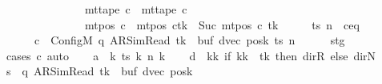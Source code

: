 \begin{isabellebody}
\ \ \ \ \ \ \ \ \ \ \ \ \ \ {\isasymand}\ mt{\isacharunderscore}{\kern0pt}tape\ c{\isacharprime}{\kern0pt}{\isacharprime}{\kern0pt}\ {\isacharequal}{\kern0pt}\ mt{\isacharunderscore}{\kern0pt}tape\ c{\isacharprime}{\kern0pt}\isanewline
\ \ \ \ \ \ \ \ \ \ \ \ \ \ {\isasymand}\ mt{\isacharunderscore}{\kern0pt}pos\ c{\isacharprime}{\kern0pt}{\isacharprime}{\kern0pt}\ {\isacharequal}{\kern0pt}\ {\isacharparenleft}{\kern0pt}mt{\isacharunderscore}{\kern0pt}pos\ c{\isacharprime}{\kern0pt}{\isacharparenright}{\kern0pt}{\isacharparenleft}{\kern0pt}tk\ {\isacharcolon}{\kern0pt}{\isacharequal}{\kern0pt}\ Suc\ {\isacharparenleft}{\kern0pt}mt{\isacharunderscore}{\kern0pt}pos\ c{\isacharprime}{\kern0pt}\ tk{\isacharparenright}{\kern0pt}{\isacharparenright}{\kern0pt}{\isachardoublequoteclose}\isanewline
%
\isadelimproof
%
\endisadelimproof
%
\isatagproof
{}\isamarkupfalse%
\ {\isacharminus}{\kern0pt}\isanewline
\ \ \isamarkupfalse%
\ ts\ n\ \ c{\isacharprime}{\kern0pt}{\isacharunderscore}{\kern0pt}eq{\isacharcolon}{\kern0pt}\isanewline
\ \ \ \ \ \ {\isachardoublequoteopen}c{\isacharprime}{\kern0pt}\ {\isacharequal}{\kern0pt}\ Config\isactrlsub M\ {\isacharparenleft}{\kern0pt}q{\isacharcomma}{\kern0pt}\ AR{\isacharunderscore}{\kern0pt}SimRead{\isacharcomma}{\kern0pt}\ tk{\isacharcomma}{\kern0pt}\ {}{\isacharcomma}{\kern0pt}\ buf{\isacharcomma}{\kern0pt}\ dvec{\isacharcomma}{\kern0pt}\ posk{\isacharparenright}{\kern0pt}\ ts\ n{\isachardoublequoteclose}\isanewline
\ \ \ \ \isamarkupfalse%
\ stg\ \isamarkupfalse%
\ {\isacharparenleft}{\kern0pt}cases\ c{\isacharprime}{\kern0pt}{\isacharparenright}{\kern0pt}\ auto\isanewline
\ \ \isamarkupfalse%
\ {\isacharquery}{\kern0pt}a\ {\isacharequal}{\kern0pt}\ {\isachardoublequoteopen}{\isasymlambda}k{\isachardot}{\kern0pt}\ ts\ k\ {\isacharparenleft}{\kern0pt}n\ k{\isacharparenright}{\kern0pt}{\isachardoublequoteclose}\isanewline
\ \ \isamarkupfalse%
\ {\isacharquery}{\kern0pt}d\ {\isacharequal}{\kern0pt}\ {\isachardoublequoteopen}{\isasymlambda}kk{\isachardot}{\kern0pt}\ if\ kk\ {\isacharequal}{\kern0pt}\ tk\ then\ dir{\isachardot}{\kern0pt}R\ else\ dir{\isachardot}{\kern0pt}N{\isachardoublequoteclose}\isanewline
\ \ \isamarkupfalse%
\ {\isacharquery}{\kern0pt}s\ {\isacharequal}{\kern0pt}\ {\isachardoublequoteopen}{\isacharparenleft}{\kern0pt}q{\isacharcomma}{\kern0pt}\ AR{\isacharunderscore}{\kern0pt}SimRead{\isacharcomma}{\kern0pt}\ tk{\isacharcomma}{\kern0pt}\ {}{\isacharcomma}{\kern0pt}\ buf{\isacharcomma}{\kern0pt}\ dvec{\isacharcomma}{\kern0pt}\ posk{\isacharparenright}{\kern0pt}{\isachardoublequoteclose}\isanewline

\end{isabellebody}
